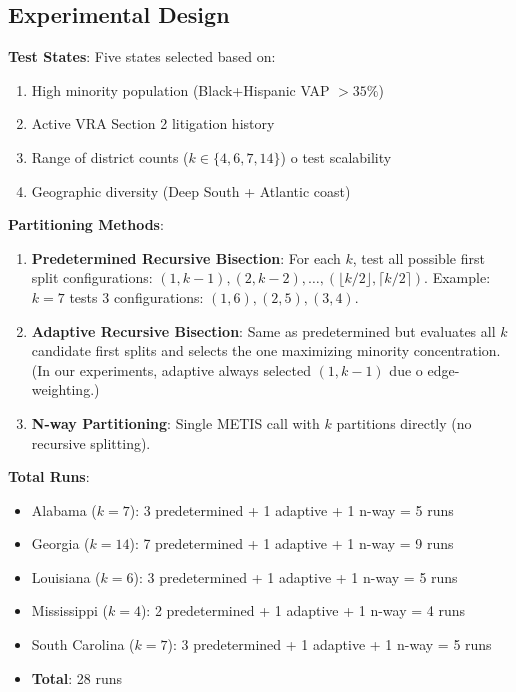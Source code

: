 \subsection{Experimental Design}

\textbf{Test States}:
Five states selected based on:
\begin{enumerate}
    \item High minority population (Black+Hispanic VAP $> 35\%$)
    \item Active VRA Section 2 litigation history
    \item Range of district counts ($k \in \{4, 6, 7, 14\}$) 	o test scalability
    \item Geographic diversity (Deep South + Atlantic coast)
\end{enumerate}

\textbf{Partitioning Methods}:
\begin{enumerate}
    \item \textbf{Predetermined Recursive Bisection}: For each $k$, test all possible first split configurations: $(1, k-1), (2, k-2), \ldots, (\lfloor k/2 \rfloor, \lceil k/2 \rceil)$. Example: $k=7$ tests 3 configurations: $(1,6), (2,5), (3,4)$.

    \item \textbf{Adaptive Recursive Bisection}: Same as predetermined but evaluates all $k$ candidate first splits and selects the one maximizing minority concentration. (In our experiments, adaptive always selected $(1, k-1)$ due 	o edge-weighting.)

    \item \textbf{N-way Partitioning}: Single METIS call with $k$ partitions directly (no recursive splitting).
\end{enumerate}

\textbf{Total Runs}:
\begin{itemize}
    \item Alabama ($k=7$): 3 predetermined + 1 adaptive + 1 n-way = 5 runs
    \item Georgia ($k=14$): 7 predetermined + 1 adaptive + 1 n-way = 9 runs
    \item Louisiana ($k=6$): 3 predetermined + 1 adaptive + 1 n-way = 5 runs
    \item Mississippi ($k=4$): 2 predetermined + 1 adaptive + 1 n-way = 4 runs
    \item South Carolina ($k=7$): 3 predetermined + 1 adaptive + 1 n-way = 5 runs
    \item \textbf{Total}: 28 runs
\end{itemize}

